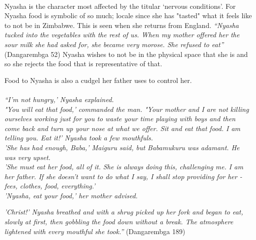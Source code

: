 \documentclass{article}
\begin{document}
\paragraph{}

Nyasha is the character most affected by the titular `nervous conditions'. For Nyasha food is symbolic of so much; locale since she has "tasted" what it feels like to not be in Zimbabwe. This is seen when she returns from England. \textit{``Nyasha tucked into the vegetables with the rest of us. When my mother offered her the sour milk she had asked for, she became very morose. She refused to eat'' }(Dangarembga 52) Nyasha wishes to not be in the physical space that she is and so she rejects the food that is representative of that. 

Food to Nyasha is also a cudgel her father uses to control her. 
\paragraph{}
\noindent
\textit{``I'm not hungry,' Nyasha explained.}\\

\noindent
\textit{"You will eat that food,' commanded the man. "Your mother and I are not killing ourselves working just for you to waste your time playing with boys and then come back and turn up your nose at what we offer. Sit and eat that food. I am telling you. Eat it!' Nyasha took a few mouthfuls.}\\

\noindent
\textit{'She has had enough, Baba,' Maiguru said, but Babamukuru was adamant. He was very upset.}\\

\noindent
\textit{'She must eat her food, all of it. She is always doing this, challenging me. I am her father. If she doesn't want to do what I say, I shall stop providing for her - fees, clothes, food, everything.'}\\


\noindent
\textit{'Nyasha, eat your food,' her mother advised.}

\noindent
\textit{'Christ!' Nyasha breathed and with a shrug picked up her fork and began to eat, slowly at first, then gobbling the food down without a break. The atmosphere lightened with every mouthful she took.''} (Dangarembga 189)
\paragraph{}
\end{document}
